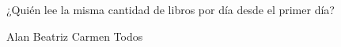  ¿Quién lee la misma cantidad de libros por d\'ia desde el primer d\'ia?

\begin{oneparchoices}\footnotesize
    \choice Alan
    \choice Beatriz
    \choice Carmen
    \CorrectChoice Todos
\end{oneparchoices}